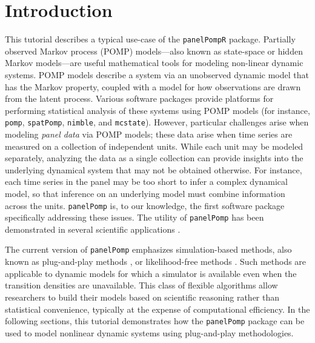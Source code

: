 \documentclass[12pt]{article}\usepackage[]{graphicx}\usepackage[table]{xcolor}
\newcommand\R{\texttt{R}\xspace}
\newcommand\panelPomp{\texttt{panelPomp}\xspace}
\newcommand\pomp{\texttt{pomp}\xspace}
\newcommand\nimble{\texttt{nimble}\xspace}
\newcommand\mcstate{\texttt{mcstate}\xspace}
\newcommand\spatPomp{\texttt{spatPomp}\xspace}
\begin{document}
\vfill




\newpage
{}


\section{Introduction}
\label{sec:intro}

This tutorial describes a typical use-case of the \panelPomp \R package.
Partially observed Markov process (POMP) models---also known as state-space or hidden Markov models---are useful mathematical tools for modeling non-linear dynamic systems.
POMP models describe a system via an unobserved dynamic model that has the Markov property, coupled with a model for how observations are drawn from the latent process.
Various software packages provide platforms for performing statistical analysis of these systems using POMP models (for instance, \pomp \citep{king16}, \spatPomp \citep{asfaw21}, \nimble \citep{michaud21}, and \mcstate \citep{fitzjohn20}).
However, particular challenges arise when modeling \emph{panel data} via POMP models; these data arise when time series are measured on a collection of independent units.
While each unit may be modeled separately, analyzing the data as a single collection can provide insights into the underlying dynamical system that may not be obtained otherwise.
For instance, each time series in the panel may be too short to infer a complex dynamical model, so that inference on an underlying model must combine information across the units.
\panelPomp is, to our knowledge, the first software package specifically addressing these issues.
The utility of \panelPomp has been demonstrated in several scientific applications \citep{ranjeva17,ranjeva19,wale19,domeyer22,lee20}.

The current version of \panelPomp emphasizes simulation-based methods, also known as plug-and-play methods \citep{breto09,he10}, or likelihood-free methods \citep{marjoram03,sisson07}.
Such methods are applicable to dynamic models for which a simulator is available even when the transition densities are unavailable.
This class of flexible algorithms allow researchers to build their models based on scientific reasoning rather than statistical convenience, typically at the expense of computational efficiency.
In the following sections, this tutorial demonstrates how the \panelPomp package can be used to model nonlinear dynamic systems using plug-and-play methodologies.
\end{document}
